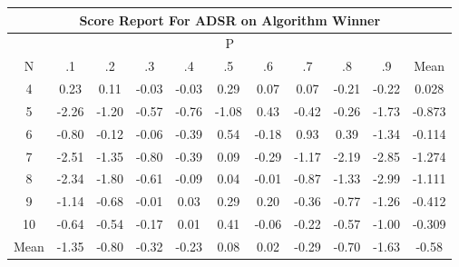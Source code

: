 \documentclass[11pt,a4paper]{report}
\begin{document}
\begin{longtable}{ | c || c | c | c | c | c | c | c | c | c || c |}
\hline
\multicolumn{11}{|c|}{ Score Report For ADSR on Algorithm Winner} \\
\hline
\multicolumn{11}{|c|}{ P } \\
\hline
N & .1 & .2 & .3 & .4 & .5 & .6 & .7 & .8 & .9 & Mean\\
 \hline
 \hline
 \endhead
  4 &  \cellcolor[HTML]{F7F7FF} 0.23 &  \cellcolor[HTML]{FFFFFF} 0.11 &  \cellcolor[HTML]{FFFFFF} -0.03 &  \cellcolor[HTML]{FFFFFF} -0.03 &  \cellcolor[HTML]{F7F7FF} 0.29 &  \cellcolor[HTML]{FFFFFF} 0.07 &  \cellcolor[HTML]{FFFFFF} 0.07 &  \cellcolor[HTML]{FFF7F7} -0.21 &  \cellcolor[HTML]{FFF7F7} -0.22 & 0.028 \\
  5 &  \cellcolor[HTML]{FFC7C7} -2.26 &  \cellcolor[HTML]{FFDFDF} -1.20 &  \cellcolor[HTML]{FFEFEF} -0.57 &  \cellcolor[HTML]{FFEFEF} -0.76 &  \cellcolor[HTML]{FFE7E7} -1.08 &  \cellcolor[HTML]{F7F7FF} 0.43 &  \cellcolor[HTML]{FFF7F7} -0.42 &  \cellcolor[HTML]{FFF7F7} -0.26 &  \cellcolor[HTML]{FFD7D7} -1.73 & -0.873 \\
  6 &  \cellcolor[HTML]{FFE7E7} -0.80 &  \cellcolor[HTML]{FFFFFF} -0.12 &  \cellcolor[HTML]{FFFFFF} -0.06 &  \cellcolor[HTML]{FFF7F7} -0.39 &  \cellcolor[HTML]{EFEFFF} 0.54 &  \cellcolor[HTML]{FFF7F7} -0.18 &  \cellcolor[HTML]{E7E7FF} 0.93 &  \cellcolor[HTML]{F7F7FF} 0.39 &  \cellcolor[HTML]{FFDFDF} -1.34 & -0.114 \\
  7 &  \cellcolor[HTML]{FFBFBF} -2.51 &  \cellcolor[HTML]{FFDFDF} -1.35 &  \cellcolor[HTML]{FFE7E7} -0.80 &  \cellcolor[HTML]{FFF7F7} -0.39 &  \cellcolor[HTML]{FFFFFF} 0.09 &  \cellcolor[HTML]{FFF7F7} -0.29 &  \cellcolor[HTML]{FFDFDF} -1.17 &  \cellcolor[HTML]{FFC7C7} -2.19 &  \cellcolor[HTML]{FFB7B7} -2.85 & -1.274 \\
  8 &  \cellcolor[HTML]{FFC7C7} -2.34 &  \cellcolor[HTML]{FFCFCF} -1.80 &  \cellcolor[HTML]{FFEFEF} -0.61 &  \cellcolor[HTML]{FFFFFF} -0.09 &  \cellcolor[HTML]{FFFFFF} 0.04 &  \cellcolor[HTML]{FFFFFF} -0.01 &  \cellcolor[HTML]{FFE7E7} -0.87 &  \cellcolor[HTML]{FFDFDF} -1.33 &  \cellcolor[HTML]{FFB7B7} -2.99 & -1.111 \\
  9 &  \cellcolor[HTML]{FFDFDF} -1.14 &  \cellcolor[HTML]{FFEFEF} -0.68 &  \cellcolor[HTML]{FFFFFF} -0.01 &  \cellcolor[HTML]{FFFFFF} 0.03 &  \cellcolor[HTML]{F7F7FF} 0.29 &  \cellcolor[HTML]{F7F7FF} 0.20 &  \cellcolor[HTML]{FFF7F7} -0.36 &  \cellcolor[HTML]{FFEFEF} -0.77 &  \cellcolor[HTML]{FFDFDF} -1.26 & -0.412 \\
  10 &  \cellcolor[HTML]{FFEFEF} -0.64 &  \cellcolor[HTML]{FFEFEF} -0.54 &  \cellcolor[HTML]{FFF7F7} -0.17 &  \cellcolor[HTML]{FFFFFF} 0.01 &  \cellcolor[HTML]{F7F7FF} 0.41 &  \cellcolor[HTML]{FFFFFF} -0.06 &  \cellcolor[HTML]{FFF7F7} -0.22 &  \cellcolor[HTML]{FFEFEF} -0.57 &  \cellcolor[HTML]{FFE7E7} -1.00 & -0.309 \\
 \hline
 \hline
Mean &  \cellcolor[HTML]{FFDFDF} -1.35 &  \cellcolor[HTML]{FFE7E7} -0.80 &  \cellcolor[HTML]{FFF7F7} -0.32 &  \cellcolor[HTML]{FFF7F7} -0.23 &  \cellcolor[HTML]{FFFFFF} 0.08 &  \cellcolor[HTML]{FFFFFF} 0.02 &  \cellcolor[HTML]{FFF7F7} -0.29 &  \cellcolor[HTML]{FFEFEF} -0.70 &  \cellcolor[HTML]{FFD7D7} -1.63 &  \cellcolor[HTML]{FFEFEF} -0.58
\end{longtable}
\end{document}

